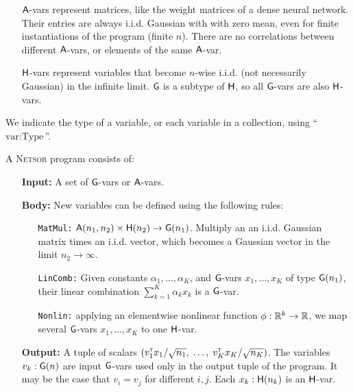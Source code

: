 \documentclass[tablecaption=bottom,wcp,nonatbib]{jmlr} %
\newcommand{\tp}{{\mathrm{\textsf{\tiny T}}}}
\begin{document}
{\begin{itemize}
\item[$\mathsf{A}$-vars] represent matrices,
like the weight matrices of a dense neural network. Their entries are always i.i.d.
Gaussian with with zero mean, even for finite instantiations of the program
(finite $n$).
There are no correlations between different $\mathsf{A}$-vars, or elements of the same $\mathsf{A}$-var.

\item[$\mathsf{H}$-vars] represent variables that become $n$-wise i.i.d. (not necessarily
Gaussian) in the
infinite limit. $\mathsf{G}$ is a subtype of $\mathsf{H}$, so all $\mathsf{G}$-vars are also $\mathsf{H}$-vars.
\end{itemize}

We indicate the type of a variable, or each variable in a
collection, using ``$\text{var} : \text{Type}$''.


\begin{definition}
A \textsc{Netsor} program consists of:
\begin{itemize}
  \item[\bf Input:]
 A set of $\mathsf{G}$-vars or $\mathsf{A}$-vars.

 \item[\bf Body:]
New variables can be defined using the following rules:
\begin{enumerate}
  \item[\texttt{MatMul:}] $\mathsf{A}(n_1, n_2) \times \mathsf{H}(n_2) \to \mathsf{G}(n_1)$. Multiply an
    an i.i.d. Gaussian matrix times an i.i.d. vector, which becomes a Gaussian
    vector in the limit $n_2 \to \infty$.
  \item[\texttt{LinComb:}] Given constants $\alpha_1,\dots,\alpha_K$, and $\mathsf{G}$-vars
    $x_1,\dots,x_K$ of type $\mathsf{G}(n_1)$, their linear combination $\sum_{k=1}^K \alpha_k
    x_k$ is a $\mathsf{G}$-var.
  \item[\texttt{Nonlin:}] applying an elementwise nonlinear function $\phi : \mathbb{R}^k \to
    \mathbb{R}$, we map
    several $\mathsf{G}$-vars $x_1,\dots,x_K$ to one $\mathsf{H}$-var. 
\end{enumerate}

\item[\bf Output:]
A tuple of scalars $(v_1^\tp x_1/\sqrt{n_1}, \;\dots, \; v_K^\tp
x_K/\sqrt{n_K})$. The variables $v_k : \mathsf{G}(n)$ are input $\mathsf{G}$-vars used only
in the output tuple of the program. It may be the case that $v_i = v_j$ for
different $i, j$. Each $x_k : \mathsf{H}(n_k)$ is an $\mathsf{H}$-var.
\end{itemize}
\end{definition}

}
\end{document}

